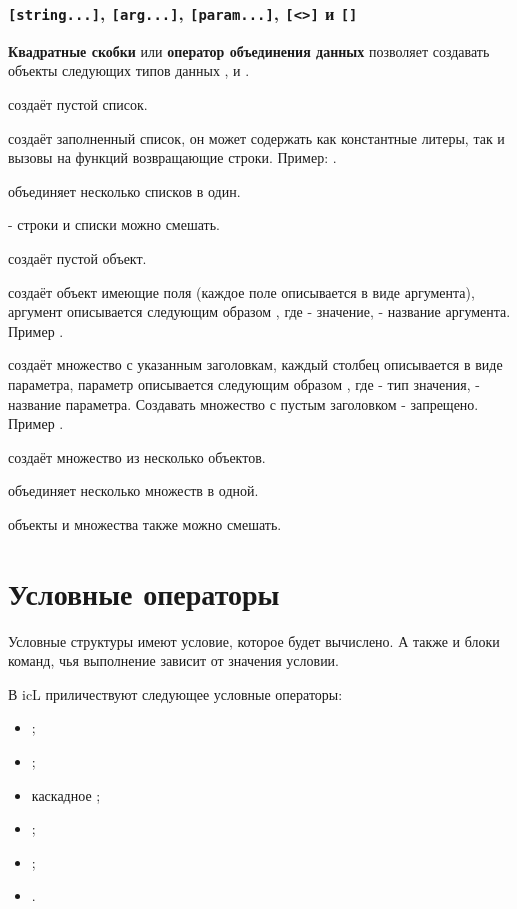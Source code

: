 \documentclass[a4paper, 14pt]{extarticle}
\newenvironment{icItems}
	{ \begin{itemize} [noitemsep,nolistsep] }
	{ \end{itemize} }
\begin{document}
\subsubsection{\lstinline`[string...]`, \lstinline`[arg...]`, \lstinline`[param...]`, \lstinline`[<>]` и \lstinline`[]`}

{\bf Квадратные скобки} или {\bf оператор объединения данных} позволяет создавать объекты следующих типов данных ,  и .
	
\code{[]} создаёт пустой список.
	
\code{[string ...]} создаёт заполненный список, он может содержать как константные литеры, так и вызовы на функций возвращающие строки. Пример: \code{["a" "b" "c"]}.
	
\code{[list ...]} объединяет несколько списков в один.
	
 - строки и списки можно смешать.
	
\code{[<>]} создаёт пустой объект.
	
\code{[arg ...]} создаёт объект имеющие поля (каждое поле описывается в виде аргумента), аргумент описывается следующим образом , где  - значение,  - название аргумента. Пример .
	
\code{[param ...]} создаёт множество с указанным заголовкам, каждый столбец описывается в виде параметра, параметр описывается следующим образом , где  - тип значения,  - название параметра. Создавать множество с пустым заголовком - запрещено. Пример .
 
\code{[object ...]} создаёт множество из несколько объектов.
	
\code{[set ...]} объединяет несколько множеств в одной.
	
 объекты и множества также можно смешать.

\newpage
\section{Условные операторы}

Условные структуры имеют условие, которое будет вычислено. А также и блоки команд, чья выполнение зависит от значения условии.
	
В icL приличествуют следующее условные операторы:
\begin{icItems}
	\item {};
	\item {};
	\item каскадное ;
	\item {};
	\item {};
	\item {}.
\end{icItems}
	
\end{document}
